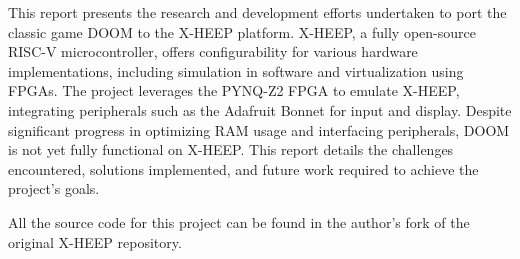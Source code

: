 This report presents the research and development efforts undertaken to port the classic game DOOM to the X-HEEP platform. X-HEEP, a fully open-source RISC-V microcontroller, offers configurability for various hardware implementations, including simulation in software and virtualization using FPGAs. The project leverages the PYNQ-Z2 FPGA to emulate X-HEEP, integrating peripherals such as the Adafruit Bonnet for input and display. Despite significant progress in optimizing RAM usage and interfacing peripherals, DOOM is not yet fully functional on X-HEEP. This report details the challenges encountered, solutions implemented, and future work required to achieve the project's goals.

All the source code for this project can be found in the author's fork \cite{projectRepo} of the original X-HEEP repository.